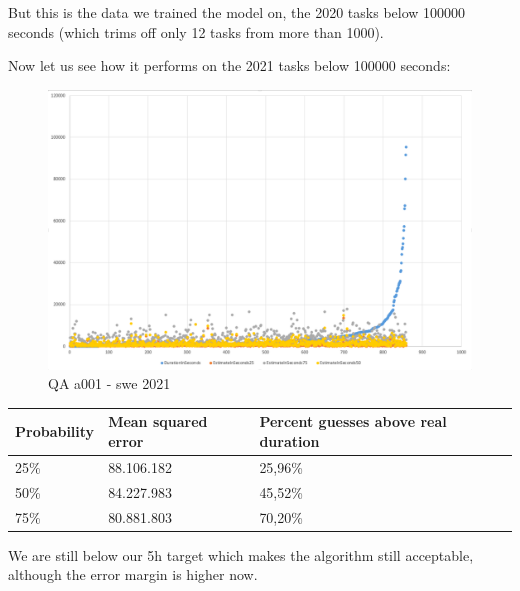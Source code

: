 But this is the data we trained the model on, the 2020 tasks below
100000 seconds (which trims off only 12 tasks from more than 1000).

Now let us see how it performs on the 2021 tasks below 100000 seconds:

\begin{figure}
\centering
\includegraphics[width=\textwidth]{Documentation/10000-A001/a001-swe2021.png}
\caption{QA a001 - swe 2021}
\end{figure}

\begin{longtable}[]{@{}lll@{}}
Probability & Mean squared error & Percent guesses above real
duration\tabularnewline
\endhead
25\% & 88.106.182 & 25,96\%\tabularnewline
50\% & 84.227.983 & 45,52\%\tabularnewline
75\% & 80.881.803 & 70,20\%\tabularnewline
\end{longtable}

We are still below our 5h target which makes the algorithm still
acceptable, although the error margin is higher now.
